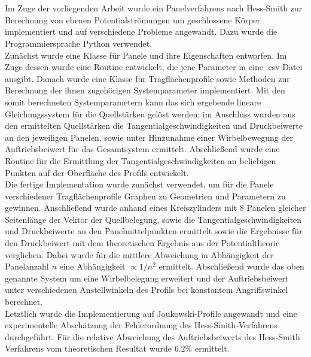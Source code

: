 \chapter*{\abstractname} %
Im Zuge der vorliegenden Arbeit wurde ein Panelverfahrens nach Hess-Smith zur Berechnung von ebenen Potentialströmungen um geschlossene Körper implementiert und auf verschiedene Probleme angewandt. Dazu wurde die Programmiersprache Python verwendet.
\\
Zunächst wurde eine Klasse für Panele und ihre Eigenschaften entworfen. Im Zuge dessen wurde eine Routine entwickelt, die jene Parameter in eine .csv-Datei ausgibt. Danach wurde eine Klasse für Tragflächenprofile sowie Methoden zur Berechnung der ihnen zugehörigen Systemparameter implementiert. Mit den somit berechneten Systemparametern kann das sich ergebende lineare Gleichungssystem für die Quellstärken gelöst werden; im Anschluss wurden aus den ermittelten Quellstärken die Tangentialgeschwindigkeiten und Druckbeiwerte an den jeweiligen Panelen, sowie unter Hinzunahme einer Wirbelbewegung der Auftriebsbeiwert für das Gesamtsystem ermittelt. Abschließend wurde eine Routine für die Ermittlung der Tangentialgeschwindigkeiten an beliebigen Punkten auf der Oberfläche des Profils entwickelt.
\\
Die fertige Implementation wurde zunächst verwendet, um für die Panele verschiedener Tragflächenprofile Graphen zu Geometrien und Parametern zu gewinnen. Anschließend wurde anhand eines Kreiszylinders mit 8 Panelen gleicher Seitenlänge der Vektor der Quellbelegung, sowie die Tangentialgeschwindigkeiten und Druckbeiwerte an den Panelmittelpunkten ermittelt sowie die Ergebnisse für den Druckbeiwert mit dem theoretischen Ergebnis aus der Potentialtheorie verglichen. Dabei wurde für die mittlere Abweichung in Abhängigkeit der Panelanzahl $n$ eine Abhängigkeit $\propto 1 / n^2$ ermittelt. Abschließend wurde das oben genannte System um eine Wirbelbelegung erweitert und der Auftriebsbeiwert unter verschiedenen Anstellwinkeln des Profils bei konstantem Angriffswinkel berechnet. 
\\
Letztlich wurde die Implementierung auf Joukowski-Profile angewandt und eine experimentelle Abschätzung der Fehlerordnung des Hess-Smith-Verfahrens durchgeführt. Für die relative Abweichung des Auftriebsbeiwerts des Hess-Smith Verfahrens vom theoretischen Resultat wurde $6.2 \%$ ermittelt.

\newpage
